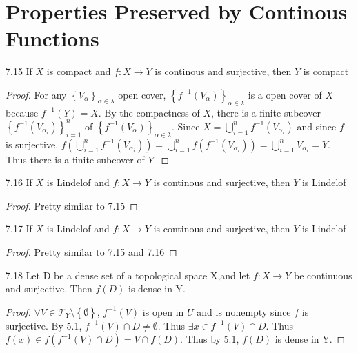 \documentclass{article}
\newcommand*{\T}{\mathcal{T}}
\newcommand*{\empset}{\emptyset}
\begin{document}
\pagebreak

\section*{Properties Preserved by Continous Functions}

\begin{claim}{7.15}\label{Claim 7.15.}
    If $X$ is compact and $f: X \to Y$ is continous and surjective, then $Y$ is compact   
\end{claim}
\begin{proof}
    For any $\left\{ V_\alpha \right\}_{\alpha \in \lambda}$ open cover, $\left\{ f^{-1}(V_{\alpha}) \right\}_{\alpha \in \lambda}$ is a open cover of $X$ because $f^{-1}(Y) = X$. By the compactness of $X$, there is a finite subcover $\left\{ f^{-1}(V_{\alpha_i}) \right\}_{i = 1}^n$  of $\left\{ f^{-1}(V_{\alpha}) \right\}_{\alpha \in \lambda}$. Since $X = \bigcup_{i = 1}^n f^{-1}(V_{\alpha_i})$ and since $f$ is surjective, $f(\bigcup_{i = 1}^n f^{-1}(V_{\alpha_i})) = \bigcup_{i = 1}^n f(f^{-1}(V_{\alpha_i})) = \bigcup_{i = 1}^n V_{\alpha_i} = Y$. Thus there is a finite subcover of $Y$.         
\end{proof}


\bigskip

\begin{claim}{7.16}\label{Claim 7.16.}
    If $X$ is Lindelof and $f: X \to Y$ is continous and surjective, then $Y$ is Lindelof   
\end{claim}
\begin{proof}
    Pretty similar to 7.15
\end{proof}

\bigskip

\begin{claim}{7.17}\label{Claim 7.17.}
    If $X$ is Lindelof and $f: X \to Y$ is continous and surjective, then $Y$ is Lindelof   
\end{claim}
\begin{proof}
    Pretty similar to 7.15 and 7.16
\end{proof}

\bigskip

\begin{claim}{7.18}\label{Claim 7.18.}
    Let D be a dense set of a topological space X,and let $f: X \to Y$ be continuous and surjective. Then $f(D)$ is dense in Y.
\end{claim}
\begin{proof}
    $\forall V \in \T_Y \setminus \left\{ \empset \right\}$, $f^{-1}(V)$ is open in $U$ and is nonempty since $f$ is surjective. By 5.1, $f^{-1}(V) \cap D \neq \empset$. Thus $\exists x \in f^{-1}(V) \cap D$. Thus $f(x) \in f(f^{-1}(V) \cap D) = V \cap f(D)$. Thus by 5.1, $f(D)$ is dense in Y.          
\end{proof}
\end{document}
